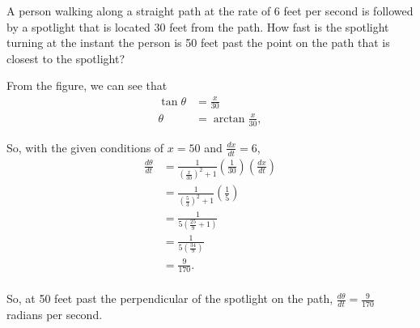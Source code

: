 \documentclass[../hw8]{subfiles}
\begin{document}
A person walking along a straight path at the rate of 6 feet
per second is followed by a spotlight that is located 30 feet
from the path. How fast is the spotlight turning at the instant
the person is 50 feet past the point on the path that is closest
to the spotlight?

\begin{figure*}[ht]
\centering
{}
\end{figure*}

From the figure, we can see that
\begin{align*}
    \tan{\theta} &= \frac{x}{30} \\
    \theta &= \arctan{\frac{x}{30}},
\end{align*}

So, with the given conditions of $x=50$ and $\frac{dx}{dt}=6$,
\begin{align*}
    \frac{d\theta}{dt} &= \frac{1}{{\left( \frac{x}{30} \right)}^2+1} \left( \frac{1}{30} \right) \left( \frac{dx}{dt} \right) \\
    &= \frac{1}{{\left( \frac{5}{3} \right)}^2+1} \left( \frac{1}{5} \right) \\
    &= \frac{1}{5\left( \frac{25}{9} + 1 \right)} \\
    &= \frac{1}{5\left( \frac{34}{9} \right)} \\
    &= \frac{9}{170}. \\
\end{align*}

So, at 50 feet past the perpendicular of the spotlight on the path, $\frac{d\theta}{dt}=\frac{9}{170}$ radians per second.
\end{document}
